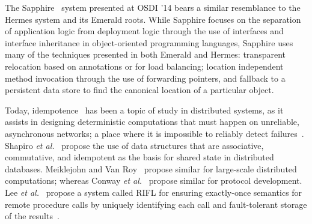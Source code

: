 The Sapphire~\cite{zhang2014customizable} system presented at OSDI '14 bears a similar resemblance to the Hermes system and its Emerald roots.  While Sapphire focuses on the separation of application logic from deployment logic through the use of interfaces and interface inheritance in object-oriented programming languages, Sapphire uses many of the techniques presented in both Emerald and Hermes: transparent relocation based on annotations or for load balancing; location independent method invocation through the use of forwarding pointers, and fallback to a persistent data store to find the canonical location of a particular object.

Today, idempotence~\cite{Helland:2012:IMC:2181796.2187821} has been a topic of study in distributed systems, as it assists in designing deterministic computations that must happen on unreliable, asynchronous networks; a place where it is impossible to reliably detect failures~\cite{fischer1985impossibility}.  Shapiro \textit{et al.}~\cite{shapiro2011comprehensive} propose the use of data structures that are associative, commutative, and idempotent as the basis for shared state in distributed databases.  Meiklejohn and Van Roy~\cite{meiklejohn2015lasp} propose similar for large-scale distributed computations; whereas Conway \textit{et al.}~\cite{conway2012logic} propose similar for protocol development.  Lee \textit{et al.}~ propose a system called RIFL for ensuring exactly-once semantics for remote procedure calls by uniquely identifying each call and fault-tolerant storage of the results~\cite{lee2015implementing}.